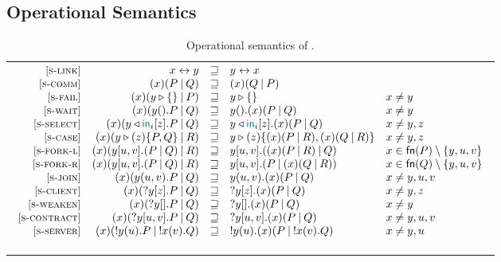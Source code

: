 \subsection{Operational Semantics}
\label{sec:semantics}

\begin{table}
    \caption{Operational semantics of \Calculus.}
    \label{tab:semantics}
    \begin{tabular}{@{}c@{}}
        \begin{math}
            \displaystyle
            \begin{array}{rrcll}
            \SLink &
            \Link\x\y & \pcong & \Link\y\x \\
            \SComm &
            \Cut\x{P}{Q} & \pcong & \Cut\x{Q}{P} \\
            \SFail &
            \Cut\x{\Fail\y}{P} & \pcong & \Fail\y & x \ne y \\
            \SWait &
            \Cut\x{\Wait\y.P}{Q} & \pcong & \Wait\y.\Cut\x{P}{Q} & x \ne y \\
            \SSelect &
            \Cut\x{\Select\y{\InTag_i}\z.P}{Q} & \pcong & \Select\y{\InTag_i}\z.\Cut\x{P}{Q} & x \ne y,z \\
            \SCase &
            \Cut\x{\Case\y\z{P}{Q}}{R} & \pcong & \Case\y\z{\Cut\x{P}{R}}{\Cut\x{Q}{R}} & x \ne y,z \\
            \SForkL &
            \Cut\x{\Fork\y\u\v{P}{Q}}{R} & \pcong & \Fork\y\u\v{\Cut\x{P}{R}}{Q} & x \in \fn{P}\setminus\set{y,u,v} \\
            \SForkR &
            \Cut\x{\Fork\y\u\v{P}{Q}}{R} & \pcong & \Fork\y\u\v{P}{\Cut\x{Q}{R}} & x \in \fn{Q}\setminus\set{y,u,v} \\
            \SJoin &
            \Cut\x{\Join\y\u\v.P}{Q} & \pcong & \Join\y\u\v.\Cut\x{P}{Q} & x \ne y,u,v \\
            \SClient &
            \Cut\x{\Client\y\z.P}{Q} & \pcong & \Client\y\z.\Cut\x{P}{Q} & x \ne y,z \\
            \SWeaken &
            \Cut\x{\Weaken\y.P}{Q} & \pcong & \Weaken\y.\Cut\x{P}{Q} & x \ne y \\
            \SContract &
            \Cut\x{\Contract\y\u\v.P}{Q} & \pcong & \Contract\y\u\v.\Cut\x{P}{Q} & x \ne y,u,v \\
            \SServer &
            \Cut\x{\Server\y\u.P}{\Server\x\v.Q} & \pcong & \Server\y\u.\Cut\x{P}{\Server\x\v.Q} & x \ne y,u \\
            \\

\end{array}
\end{math}
\end{tabular}
\end{table}
